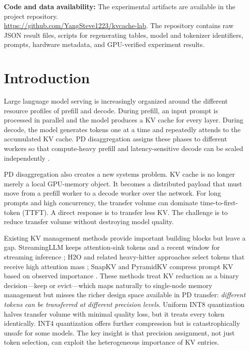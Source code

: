 \documentclass[11pt]{article}
\theoremstyle{definition}
\theoremstyle{plain}
\begin{document}
\noindent\textbf{Code and data availability:} The experimental artifacts are available in the project repository.\\
\url{https://github.com/YangSteve1223/kvcache-lab}.  The repository contains raw JSON result files, scripts for regenerating tables, model and tokenizer identifiers, prompts, hardware metadata, and GPU-verified experiment results.

\section{Introduction}
\label{sec:introduction}

Large language model serving is increasingly organized around the different resource profiles of prefill and decode.  During prefill, an input prompt is processed in parallel and the model produces a KV cache for every layer.  During decode, the model generates tokens one at a time and repeatedly attends to the accumulated KV cache.  PD disaggregation assigns these phases to different workers so that compute-heavy prefill and latency-sensitive decode can be scaled independently \citep{splitwise,distserve,mooncake}.

PD disaggregation also creates a new systems problem.  KV cache is no longer merely a local GPU-memory object.  It becomes a distributed payload that must move from a prefill worker to a decode worker over the network.  For long prompts and high concurrency, the transfer volume can dominate time-to-first-token (TTFT).  A direct response is to transfer less KV.  The challenge is to reduce transfer volume without destroying model quality.

Existing KV management methods provide important building blocks but leave a gap.  StreamingLLM keeps attention-sink tokens and a recent window for streaming inference \citep{streamingllm}; H2O and related heavy-hitter approaches select tokens that receive high attention mass \citep{h2o}; SnapKV and PyramidKV compress prompt KV based on observed importance \citep{snapkv,pyramidkv}.  These methods treat KV reduction as a binary decision---keep or evict---which maps naturally to single-node memory management but misses the richer design space available in PD transfer: \emph{different tokens can be transferred at different precision levels}.  Uniform INT8 quantization halves transfer volume with minimal quality loss, but it treats every token identically.  INT4 quantization offers further compression but is catastrophically unsafe for some models.  The key insight is that precision assignment, not just token selection, can exploit the heterogeneous importance of KV entries.
\end{document}
